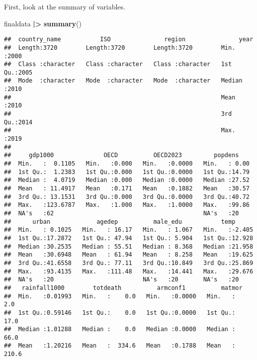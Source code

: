 \documentclass[
]{article}
\newenvironment{Shaded}{\begin{snugshade}}{\end{snugshade}}
\newcommand{\FunctionTok}[1]{\textcolor[rgb]{0.13,0.29,0.53}{\textbf{#1}}}
\newcommand{\NormalTok}[1]{#1}
\newcommand{\SpecialCharTok}[1]{\textcolor[rgb]{0.81,0.36,0.00}{\textbf{#1}}}
\begin{document}
First, look at the summary of variables.

\begin{Shaded}
\begin{Highlighting}[]
\NormalTok{finaldata }\SpecialCharTok{|\textgreater{}}
  \FunctionTok{summary}\NormalTok{()}
\end{Highlighting}
\end{Shaded}

\begin{verbatim}
##  country_name           ISO               region               year     
##  Length:3720        Length:3720        Length:3720        Min.   :2000  
##  Class :character   Class :character   Class :character   1st Qu.:2005  
##  Mode  :character   Mode  :character   Mode  :character   Median :2010  
##                                                           Mean   :2010  
##                                                           3rd Qu.:2014  
##                                                           Max.   :2019  
##                                                                         
##     gdp1000              OECD          OECD2023         popdens     
##  Min.   :  0.1105   Min.   :0.000   Min.   :0.0000   Min.   : 0.00  
##  1st Qu.:  1.2383   1st Qu.:0.000   1st Qu.:0.0000   1st Qu.:14.79  
##  Median :  4.0719   Median :0.000   Median :0.0000   Median :27.52  
##  Mean   : 11.4917   Mean   :0.171   Mean   :0.1882   Mean   :30.57  
##  3rd Qu.: 13.1531   3rd Qu.:0.000   3rd Qu.:0.0000   3rd Qu.:40.72  
##  Max.   :123.6787   Max.   :1.000   Max.   :1.0000   Max.   :99.86  
##  NA's   :62                                          NA's   :20     
##      urban             agedep          male_edu           temp       
##  Min.   : 0.1025   Min.   : 16.17   Min.   : 1.067   Min.   :-2.405  
##  1st Qu.:17.2872   1st Qu.: 47.94   1st Qu.: 5.904   1st Qu.:12.928  
##  Median :30.2535   Median : 55.51   Median : 8.368   Median :21.958  
##  Mean   :30.6948   Mean   : 61.94   Mean   : 8.258   Mean   :19.625  
##  3rd Qu.:41.6558   3rd Qu.: 77.11   3rd Qu.:10.849   3rd Qu.:25.869  
##  Max.   :93.4135   Max.   :111.48   Max.   :14.441   Max.   :29.676  
##  NA's   :20                         NA's   :20       NA's   :20      
##   rainfall1000        totdeath          armconf1          matmor      
##  Min.   :0.01993   Min.   :    0.0   Min.   :0.0000   Min.   :   2.0  
##  1st Qu.:0.59146   1st Qu.:    0.0   1st Qu.:0.0000   1st Qu.:  17.0  
##  Median :1.01288   Median :    0.0   Median :0.0000   Median :  66.0  
##  Mean   :1.20216   Mean   :  334.6   Mean   :0.1788   Mean   : 210.6  

\end{verbatim}
\end{document}
